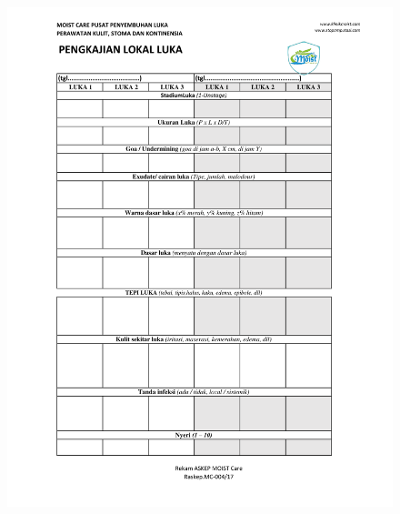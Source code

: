 \begin{figure}[H]
	\centering
	\includegraphics[keepaspectratio, width=14cm]{gambar/Format_Pengkajian-6}
	\label{gambar:Format_Pengkajian_6}
\end{figure}

